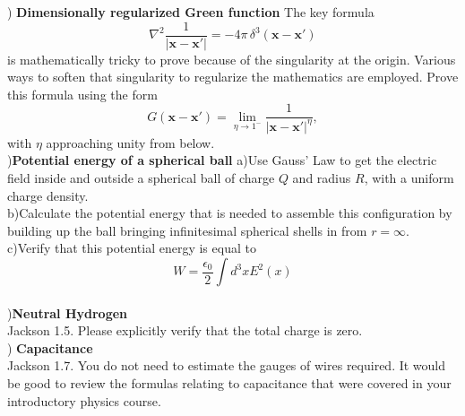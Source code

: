 \documentclass[letterpage]{article}
\begin{document}
) \textbf{Dimensionally regularized Green function}
The key formula
\begin{equation}
  \nabla^2 \frac{1}{|\mathbf{x} - \mathbf{x'}|} = -4\pi \,\delta^3 (\mathbf{x} - 
  \mathbf{x'})
\end{equation}
is mathematically tricky to prove because of the singularity at the origin.
Various ways to soften that singularity to regularize the mathematics are
employed. Prove this formula using the form
\begin{equation}
  G(\mathbf{x}-\mathbf{x'}) = \lim_{\eta \to 1^-} \frac{1}{|\mathbf{x}-
  \mathbf{x'}|^\eta},
\end{equation}
with $\eta$ approaching unity from below.\\

)\textbf{Potential energy of a spherical ball}
a)Use Gauss' Law to get the electric field inside and outside a spherical
ball of charge $Q$ and radius $R$, with a uniform charge density.\\
b)Calculate the potential energy that is needed to assemble this configuration
by building up the ball bringing infinitesimal spherical shells in from 
$r = \infty$.\\
c)Verify that this potential energy is equal to
\begin{equation}
  W = \frac{\epsilon_0}{2} \int d^3xE^2(x)
\end{equation}\\

)\textbf{Neutral Hydrogen}\\
Jackson 1.5. Please explicitly verify that the total charge is zero.\\

) \textbf{Capacitance}\\
Jackson 1.7. You do not need to estimate the gauges of wires required.
It would be good to review the formulas relating to capacitance that were
covered in your introductory physics course.
\end{document}
